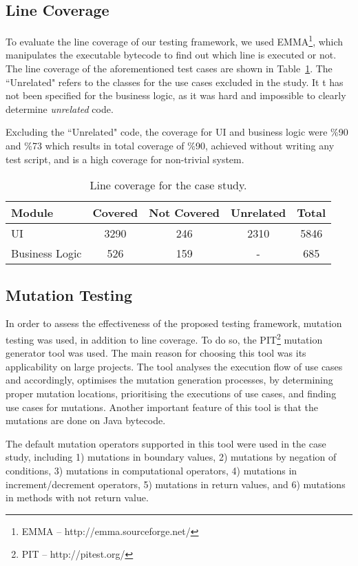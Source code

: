 \subsection{Line Coverage}
\label{sec:case-study-line-coverage}
To evaluate the line coverage of our testing framework, we used EMMA\footnote{EMMA – http://emma.sourceforge.net/}, which manipulates the executable bytecode to find out which line is executed or not. The line coverage of the aforementioned test cases are shown in Table~\ref{tbl:case-study-coverage}. The ``Unrelated" refers to the classes for the use cases excluded in the study. It t has not been specified for the business logic, as it was hard and impossible to clearly determine \textit{unrelated} code.

Excluding the ``Unrelated" code, the coverage for UI and business logic were \%90 and \%73 which results in total coverage of \%90, achieved without writing any test script, and is a high coverage for non-trivial system.

\begin{table}[!t]
\caption{Line coverage for the case study.}
\label{tbl:case-study-coverage}
\centering
\begin{tabular}{|p{2cm}|c|c|c|c|}
\hline
Module & Covered & Not Covered & Unrelated & Total \\ \hline
UI & 3290 & 246 & 2310 & 5846 \\ \hline
Business Logic & 526	& 159 & - & 685 \\
\hline
\end{tabular}
\end{table}

\subsection{Mutation Testing}
\label{sec:case-study-mutation}
In order to assess the effectiveness of the proposed testing framework, mutation testing was used, in addition to line coverage. To do so, the PIT\footnote{PIT – http://pitest.org/} mutation generator tool was used. The main reason for choosing this tool was its applicability on large projects. The tool analyses the execution flow of use cases and accordingly, optimises the mutation generation processes, by determining proper mutation locations, prioritising the executions of use cases, and finding use cases for mutations. Another important feature of this tool is that the mutations are done on Java bytecode.

The default mutation operators supported in this tool were used in the case study, including 1) mutations in boundary values, 2) mutations by negation of conditions, 3) mutations in computational operators, 4) mutations in increment/decrement operators, 5) mutations in return values, and 6) mutations in methods with not return value.

